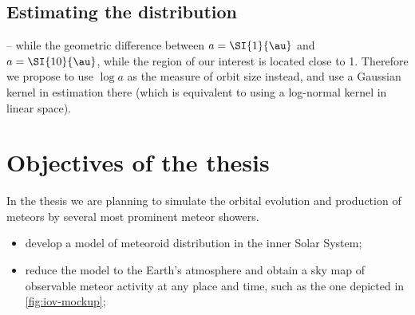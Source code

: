     \subsection{Estimating the distribution} \label{pod}
        -- while the geometric difference between $a = \SI{1}{\au}$ and $a = \SI{10}{\au}$,
        while the region of our interest is located close to \SI{1}{\au}.
        Therefore we propose to use $\log a$ as the measure of orbit size instead, and use a Gaussian
        kernel in estimation there (which is equivalent to using a log-normal kernel in linear space).

\section{Objectives of the thesis} \label{iO}
    In the thesis we are planning to simulate the orbital evolution and production of meteors
    by several most prominent meteor showers.

    \begin{itemize}
        \item develop a model of meteoroid distribution in the inner Solar System;
        \item reduce the model to the Earth's atmosphere and obtain a sky map
            of observable meteor activity at any place and time,
            such as the one depicted in \cref{fig:iov-mockup};

    \end{itemize}

